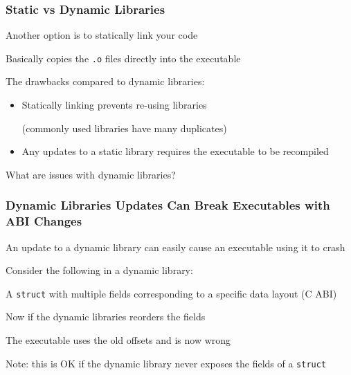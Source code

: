   \begin{frame}
    \frametitle{Static vs Dynamic Libraries}

    Another option is to statically link your code

    \hspace{1em} Basically copies the \texttt{.o} files directly into the
    executable

    \vspace{2em}

    The drawbacks compared to dynamic libraries:
    \begin{itemize}
      \item Statically linking prevents re-using libraries
      
            (commonly used libraries have many duplicates)
      \item Any updates to a static library requires the executable to be
            recompiled
    \end{itemize}

    \vspace{2em}

    What are issues with dynamic libraries?
  \end{frame}

  \begin{frame}
    \frametitle{Dynamic Libraries Updates Can Break Executables with ABI
                Changes}

    An update to a dynamic library can easily cause an executable using it to
    crash

    \vspace{1em}

    Consider the following in a dynamic library:

    \hspace{1em} A \texttt{struct} with multiple fields corresponding to
    a specific data layout (C ABI)

    \vspace{1em}


    \vspace{1em}

    Now if the dynamic libraries reorders the fields

    \hspace{1em} The executable uses the old offsets and is now wrong

    \vspace{1em}

    Note: this is OK if the dynamic library never exposes the fields of a
    \texttt{struct}
  \end{frame}


